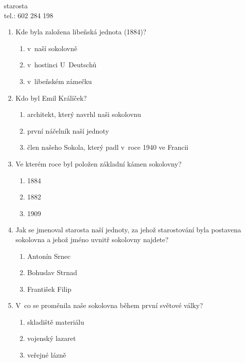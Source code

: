 \documentclass[11pt]{article}
\begin{document}
\signature{Jiří Novák (Jirkan)}{starosta\\tel.: 602 284 198}

\vspace*{24pt}


\begin{enumerate}
  \item Kde byla založena libeňská jednota (1884)?
  \begin{enumerate}
    \item v~naší sokolovně
    \item v~hostinci U~Deutschů
    \item v~libeňském zámečku
  \end{enumerate}
  \vspace*{6pt}

  \item Kdo byl Emil Králíček?
  \begin{enumerate}
    \item architekt, který navrhl naši sokolovnu
    \item první náčelník naší jednoty
    \item člen našeho Sokola, který padl v~roce 1940 ve Francii
  \end{enumerate}
  \vspace*{6pt}
 
  \item Ve kterém roce byl položen základní kámen sokolovny?
  \begin{enumerate}
    \item 1884
    \item 1882
    \item 1909
  \end{enumerate}
  \vspace*{6pt}

  \item Jak se jmenoval starosta naší jednoty, za jehož starostování byla postavena sokolovna a jehož jméno uvnitř sokolovny najdete?
  \begin{enumerate}
    \item Antonín Srnec
    \item Bohuslav Strnad
    \item František Filip
  \end{enumerate}
  \vspace*{6pt}

  \item V~co se proměnila naše sokolovna během první světové války?
  \begin{enumerate}
    \item skladiště materiálu
    \item vojenský lazaret
    \item veřejné lázně
  \end{enumerate}
\end{enumerate}
\end{document}
